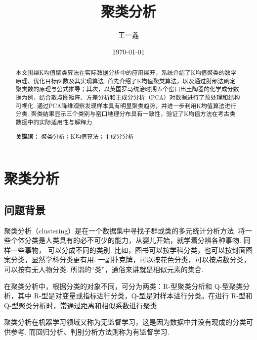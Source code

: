 \documentclass[12pt, a4paper, oneside]{ctexart}
\title{\textbf{聚类分析}}
\author{王一鑫}
\date{\today}
\begin{document}
	
	\maketitle
	
	\setcounter{page}{0}
	\maketitle
	\thispagestyle{empty}
	
	\begin{abstract} 
		本文围绕K均值聚类算法在实际数据分析中的应用展开，系统介绍了K均值聚类的数学原理、优化目标函数及其实现算法. 首先介绍了K均值聚类算法，以及通过肘部法确定聚类数的原理与公式推导；其次，以英国罗马统治时期五个窑口出土陶器的化学成分数据为例，结合散点图矩阵、方差分析和主成分分析（PCA）对数据进行了预处理和结构可视化. 通过PCA降维观察发现样本具有明显聚类趋势，并进一步利用K均值算法进行分类. 聚类结果显示三个类别与窑口地理分布具有一致性，验证了K均值方法在考古类数据中的实际适用性与解释力.
		
		\par\textbf{关键词：} 聚类分析；K均值算法；主成分分析
	\end{abstract}
		
	\newpage
	\setcounter{page}{1}
	\tableofcontents
	\newpage
	\setcounter{page}{1}
	
	\section{聚类分析}
	
	\subsection{问题背景}
	聚类分析（clustering）是在一个数据集中寻找子群或类的多元统计分析方法. 将一些个体分类是人类具有的必不可少的能力，从婴儿开始，就学着分辨各种事物. 同样一些事物， 可以分成不同的类别. 比如，图书可以按学科分类，也可以按封面图案分类，显然学科分类更有用. 一副扑克牌，可以按花色分类，可以按点数分类，可以按有无人物分类. 所谓的“类”，通俗来讲就是相似元素的集合.
	
	在聚类分析中，根据分类的对象不同，可分为两类：R-型聚类分析和 Q-型聚类分析，其中 R-型是对变量或指标进行分类，Q-型是对样本进行分类。在进行 R-型和 Q-型聚类分析时，常通过距离和相似系数进行聚类.
	
	聚类分析在机器学习领域又称为无监督学习，这是因为数据中并没有现成的分类可供参考. 而回归分析、判别分析方法则称为有监督学习.
	
\end{document}
